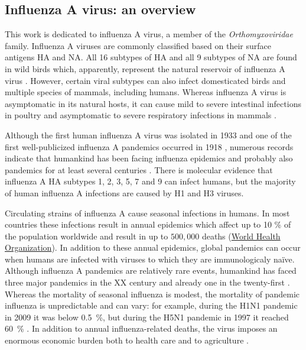 \subsection{Influenza A virus: an overview}
	
	This work is dedicated to influenza A virus, a member of the \textit{Orthomyxoviridae} family. Influenza A viruses are commonly classified based on their surface antigens \gls{HA} and \gls{NA}. All 16 subtypes of \gls{HA} and all 9 subtypes of \gls{NA} are found in wild birds which, apparently, represent the natural reservoir of influenza A virus \parencite{Stallknecht2007}. However, certain viral subtypes can also infect domesticated birds and multiple species of mammals, including humans. Whereas influenza A virus is asymptomatic in its natural hosts, it can cause mild to severe intestinal infections in poultry and asymptomatic to severe respiratory infections in mammals \parencite{Webster1992}. 
	
	Although the first human influenza A virus was isolated in 1933 \parencite{Smith1933} and one of the first well-publicized influenza A pandemics occurred in 1918 \parencite{Taubenberger1997}, numerous records indicate that humankind has been facing influenza epidemics and probably also pandemics for at least several centuries \parencite{Potter2001}. There is molecular evidence that influenza A \gls{HA} subtypes 1, 2, 3, 5, 7 and 9 can infect humans, but the  majority of human influenza A infections are caused by H1 and H3 viruses.
	
	Circulating strains of influenza A cause seasonal infections in humans. In most countries these infections result in annual epidemics which affect up to 10 \% of the population worldwide and result in up to $500,000$ deaths (\hyperlink{www.who.in}{World Health Organization}). In addition to these annual epidemics, global pandemics can occur when humans are infected with viruses to which they are immunologicaly na\"{i}ve. Although influenza A pandemics are relatively rare events, humankind has faced three major pandemics in the XX century and already one in the twenty-first \parencite{Lagace-Wiens2010, Fineberg2014}.  Whereas the mortality of seasonal influenza is modest, the mortality of pandemic influenza is unpredictable and can vary: for example, during the H1N1 pandemic in 2009 it was below 0.5~\%, but during the H5N1 pandemic in 1997 it reached 60~\% \parencite{Forrest2010, Noah2013}. In addition to annual influenza-related deaths, the virus imposes an enormous economic burden both to health care and to agriculture \parencite{Szucs1999, Noah2013}. 
	
